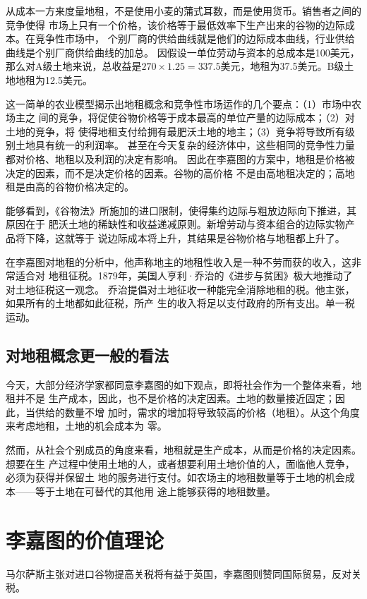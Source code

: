 从成本一方来度量地租，不是使用小麦的蒲式耳数，而是使用货币。销售者之间的竞争使得
市场上只有一个价格，该价格等于最低效率下生产出来的谷物的边际成本。在竞争性市场中，
个别厂商的供给曲线就是他们的边际成本曲线，行业供给曲线是个别厂商供给曲线的加总。
因假设一单位劳动与资本的总成本是100美元，那么对A级土地来说，总收益是$270 \times
1.25 = 337.5$美元，地租为37.5美元。B级土地地租为12.5美元。

这一简单的农业模型揭示出地租概念和竞争性市场运作的几个要点：（1）市场中农场主之
间的竞争，将促使谷物价格等于成本最高的单位产量的边际成本；（2）对土地的竞争，将
使得地租支付给拥有最肥沃土地的地主；（3）竞争将导致所有级别土地具有统一的利润率。
甚至在今天复杂的经济体中，这些相同的竞争性力量都对价格、地租以及利润的决定有影响。
因此在李嘉图的方案中，地租是价格被决定的因素，而不是决定价格的因素。谷物的高价格
不是由高地租决定的；高地租是由高的谷物价格决定的。

能够看到，《谷物法》所施加的进口限制，使得集约边际与粗放边际向下推进，其原因在于
肥沃土地的稀缺性和收益递减原则。新增劳动与资本组合的边际实物产品将下降，这就等于
说边际成本将上升，其结果是谷物价格与地租都上升了。

在李嘉图对地租的分析中，他声称地主的地租性收入是一种不劳而获的收入，这非常适合对
地租征税。1879年，美国人亨利·乔治的《进步与贫困》极大地推动了对土地征税这一观念。
乔治提倡对土地征收一种能完全消除地租的税。他主张，如果所有的土地都如此征税，所产
生的收入将足以支付政府的所有支出。单一税运动。

\subsection{对地租概念更一般的看法}

今天，大部分经济学家都同意李嘉图的如下观点，即将社会作为一个整体来看，地租并不是
生产成本，因此，也不是价格的决定因素。土地的数量接近固定；因此，当供给的数量不增
加时，需求的增加将导致较高的价格（地租）。从这个角度来考虑地租，土地的机会成本为
零。

然而，从社会个别成员的角度来看，地租就是生产成本，从而是价格的决定因素。想要在生
产过程中使用土地的人，或者想要利用土地价值的人，面临他人竞争，必须为获得并保留土
地的服务进行支付。如农场主的地租数量等于土地的机会成本——等于土地在可替代的其他用
途上能够获得的地租数量。

\section{李嘉图的价值理论}

马尔萨斯主张对进口谷物提高关税将有益于英国，李嘉图则赞同国际贸易，反对关税。

